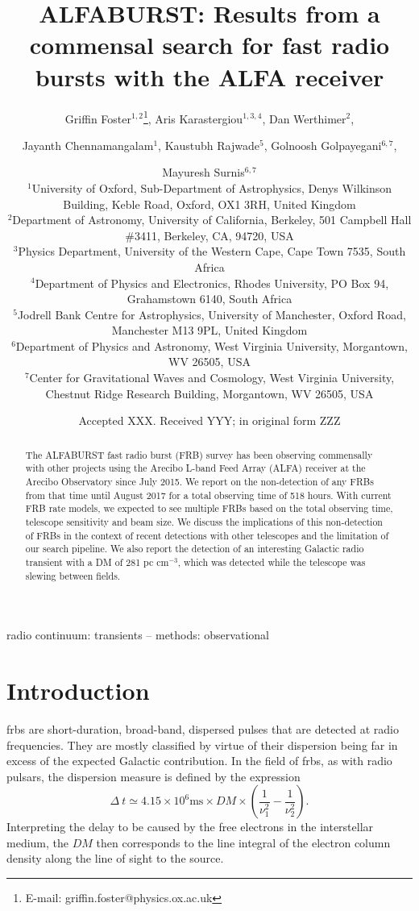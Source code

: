 \documentclass[a4paper,fleqn,usenatbib]{mnras}
\title[The ALFABURST Commensal FRB Survey]{ALFABURST: Results from a commensal search for
fast radio bursts with the ALFA receiver}
\author[G. Foster et al.]{Griffin Foster$^{1,2}$\thanks{E-mail: griffin.foster@physics.ox.ac.uk},
Aris Karastergiou$^{1,3,4}$,
Dan Werthimer$^{2}$,
\and Jayanth Chennamangalam$^{1}$,
Kaustubh Rajwade$^{5}$,
Golnoosh Golpayegani$^{6,7}$,
\and Mayuresh Surnis$^{6,7}$
\\
$^{1}$University of Oxford, Sub-Department of Astrophysics, Denys Wilkinson Building, Keble Road, Oxford, OX1 3RH, United Kingdom\\
$^{2}$Department of Astronomy, University of California, Berkeley, 501 Campbell Hall \#3411, Berkeley, CA, 94720, USA\\
$^{3}$Physics Department, University of the Western Cape, Cape Town 7535, South Africa\\
$^{4}$Department of Physics and Electronics, Rhodes University, PO Box 94, Grahamstown 6140, South Africa\\
$^{5}$Jodrell Bank Centre for Astrophysics, University of Manchester, Oxford Road, Manchester M13 9PL, United Kingdom\\ 
$^{6}$Department of Physics and Astronomy, West Virginia University, Morgantown, WV 26505, USA\\
$^{7}$Center for Gravitational Waves and Cosmology, West Virginia University, Chestnut Ridge Research Building, Morgantown, WV 26505, USA\\
}
\date{Accepted XXX. Received YYY; in original form ZZZ}
\begin{document}
\label{firstpage}
\pagerange{\pageref{firstpage}--\pageref{lastpage}}
\maketitle

\begin{abstract}
The ALFABURST fast radio burst (FRB) survey has been observing commensally with
other projects using the Arecibo L-band Feed Array (ALFA) receiver at the
Arecibo Observatory since July 2015. We report on the non-detection of any FRBs
from that time until August 2017 for a total observing time of 518 hours.
With current FRB rate models, we expected to see multiple FRBs based on the
total observing time, telescope sensitivity and beam size. We discuss the
implications of this non-detection of FRBs in the context of recent detections
with other telescopes and the limitation of our search pipeline. We also report
the detection of an interesting Galactic radio transient with a DM of 281 pc
cm$^{-3}$, which was detected while the telescope was slewing between fields.
\end{abstract}

\begin{keywords}
radio continuum: transients -- methods: observational
\end{keywords}



\section{Introduction}
\label{sec:intro}

\glspl{frb} are short-duration, broad-band, dispersed pulses that are detected
at radio frequencies. They are mostly classified by virtue of their dispersion
being far in excess of the expected Galactic contribution. In the field of
\glspl{frb}, as with radio pulsars, the dispersion measure is defined by the
expression
%
\begin{equation}
\Delta~t \simeq 4.15 \times 10^6 \textrm{ms} \times DM
\times\left(\frac{1}{\nu_1^2} - \frac{1}{\nu_2^2}\right).
\end{equation}
%
Interpreting the delay to be caused by the free electrons in the
interstellar medium, the $DM$ then corresponds to the line integral of
the electron column density along the line of sight to the source.
\end{document}
